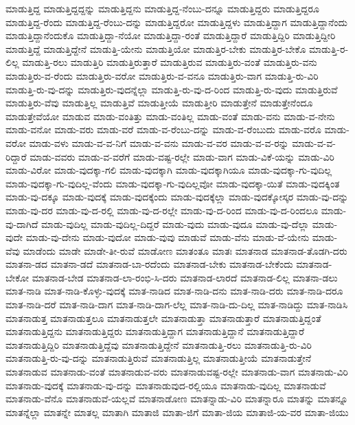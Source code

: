 {ಮಾಡುತ್ತಿದ್ದ
ಮಾಡುತ್ತಿದ್ದದ್ದನ್ನು
ಮಾಡುತ್ತಿದ್ದನು
ಮಾಡುತ್ತಿದ್ದ-ನೆಂಬು-ದನ್ನೂ
ಮಾಡುತ್ತಿದ್ದರು
ಮಾಡುತ್ತಿದ್ದರೂ
ಮಾಡುತ್ತಿದ್ದ-ರೆಂದು
ಮಾಡುತ್ತಿದ್ದ-ರೆಂಬು-ದನ್ನು
ಮಾಡುತ್ತಿದ್ದರೋ
ಮಾಡುತ್ತಿದ್ದಳು
ಮಾಡುತ್ತಿದ್ದಾಗ
ಮಾಡುತ್ತಿದ್ದಾನೆಂದು
ಮಾಡುತ್ತಿದ್ದಾನೆಂದುಕೊ
ಮಾಡುತ್ತಿದ್ದಾ-ನೆಯೋ
ಮಾಡುತ್ತಿದ್ದಾ-ರಂತೆ
ಮಾಡುತ್ತಿದ್ದಾರೆ
ಮಾಡುತ್ತಿದ್ದಿರಿ
ಮಾಡುತ್ತಿದ್ದೀರಿ
ಮಾಡುತ್ತಿದ್ದೆ
ಮಾಡುತ್ತಿದ್ದೇನೆ
ಮಾಡುತ್ತಿ-ಯೇನು
ಮಾಡುತ್ತಿಯೋ
ಮಾಡುತ್ತಿರ-ಬೇಕು
ಮಾಡುತ್ತಿರ-ಬೇಕೊ
ಮಾಡುತ್ತಿ-ರ-ಲಿಲ್ಲ
ಮಾಡುತ್ತಿ-ರಲು
ಮಾಡುತ್ತಿರಿ
ಮಾಡುತ್ತಿರುತ್ತಾರೆ
ಮಾಡುತ್ತಿರುವ
ಮಾಡುತ್ತಿರು-ವಂತೆ
ಮಾಡುತ್ತಿರು-ವನು
ಮಾಡುತ್ತಿರು-ವ-ರೆಂದು
ಮಾಡುತ್ತಿರು-ವರೋ
ಮಾಡುತ್ತಿರು-ವ-ವನೂ
ಮಾಡುತ್ತಿರು-ವಾಗ
ಮಾಡುತ್ತಿ-ರು-ವಿರಿ
ಮಾಡುತ್ತಿ-ರು-ವು-ದನ್ನು
ಮಾಡುತ್ತಿರು-ವುದನ್ನೆಲ್ಲಾ
ಮಾಡುತ್ತಿ-ರು-ವು-ದ-ರಿಂದ
ಮಾಡುತ್ತಿ-ರು-ವುದು
ಮಾಡುತ್ತಿರುವೆ
ಮಾಡುತ್ತಿರು-ವೆವು
ಮಾಡುತ್ತಿಲ್ಲ
ಮಾಡುತ್ತಿವೆ
ಮಾಡುತ್ತೀಯೆ
ಮಾಡುತ್ತೀರಿ
ಮಾಡುತ್ತೇನೆ
ಮಾಡುತ್ತೇನೆಂದೂ
ಮಾಡುತ್ತೇವೆಯೋ
ಮಾಡುವ
ಮಾಡು-ವಂತಿತ್ತು
ಮಾಡು-ವಂತಿಲ್ಲ
ಮಾಡು-ವಂತೆ
ಮಾಡು-ವನು
ಮಾಡು-ವ-ನೇನು
ಮಾಡು-ವನೋ
ಮಾಡು-ವರು
ಮಾಡು-ವರೆ
ಮಾಡು-ವ-ರೆಂಬು-ದನ್ನು
ಮಾಡು-ವ-ರೆಂಬುದು
ಮಾಡು-ವರೊ
ಮಾಡು-ವರೋ
ಮಾಡು-ವಳು
ಮಾಡು-ವ-ವ-ನಿಗೆ
ಮಾಡು-ವ-ವನು
ಮಾಡು-ವ-ವರ
ಮಾಡು-ವ-ವ-ರನ್ನು
ಮಾಡು-ವ-ವ-ರಿದ್ದಾರೆ
ಮಾಡು-ವವರು
ಮಾಡು-ವ-ವರೆಗೆ
ಮಾಡು-ವಷ್ಟ-ರಲ್ಲೇ
ಮಾಡು-ವಾಗ
ಮಾಡು-ವಿಕೆ-ಯನ್ನು
ಮಾಡು-ವಿರಿ
ಮಾಡು-ವಿರೋ
ಮಾಡು-ವುದಕ್ಕಾ-ಗಲಿ
ಮಾಡು-ವುದಕ್ಕಾಗಿ
ಮಾಡು-ವುದಕ್ಕಾಗಿಯೂ
ಮಾಡು-ವುದಕ್ಕಾ-ಗು-ವುದಿಲ್ಲ
ಮಾಡು-ವುದಕ್ಕಾ-ಗು-ವುದಿಲ್ಲ-ವೆಂದು
ಮಾಡು-ವುದಕ್ಕಾ-ಗು-ವುದಿಲ್ಲವೋ
ಮಾಡು-ವುದಕ್ಕಾ-ಯಿತೆ
ಮಾಡು-ವುದಕ್ಕಿಂತ
ಮಾಡು-ವು-ದಕ್ಕೂ
ಮಾಡು-ವುದಕ್ಕೆ
ಮಾಡು-ವುದಕ್ಕೆಂದು
ಮಾಡು-ವುದಕ್ಕೆಲ್ಲಾ
ಮಾಡು-ವುದಕ್ಕೋಸ್ಕರ
ಮಾಡು-ವು-ದನ್ನು
ಮಾಡು-ವು-ದರ
ಮಾಡು-ವು-ದ-ರಲ್ಲಿ
ಮಾಡು-ವು-ದ-ರಲ್ಲೇ
ಮಾಡು-ವು-ದ-ರಿಂದ
ಮಾಡು-ವು-ದ-ರಿಂದಲೂ
ಮಾಡು-ವು-ದಾಗಿದೆ
ಮಾಡು-ವುದಿಲ್ಲ
ಮಾಡು-ವುದಿಲ್ಲ-ದಿದ್ದರೆ
ಮಾಡು-ವುದು
ಮಾಡು-ವುದೂ
ಮಾಡು-ವು-ದೆಲ್ಲಾ
ಮಾಡು-ವುದೇ
ಮಾಡು-ವು-ದೇನು
ಮಾಡು-ವುದೋ
ಮಾಡು-ವುವು
ಮಾಡುವೆ
ಮಾಡು-ವೆನು
ಮಾಡು-ವೆ-ಯೇನು
ಮಾಡು-ವೆವು
ಮಾಡೆಂದು
ಮಾಡೇ
ಮಾಡೇ-ತೀ-ರುವೆ
ಮಾಡೋಣ
ಮಾತಂತೂ
ಮಾತಃ
ಮಾತನಾಡ
ಮಾತನಾಡ-ತೊಡಗಿ-ದರು
ಮಾತನಾ-ಡದ
ಮಾತನಾ-ಡದೆ
ಮಾತನಾಡ-ಬಾ-ರದೆಂದು
ಮಾತನಾಡ-ಬೇಕು
ಮಾತನಾಡ-ಬೇಕೆಂದು
ಮಾತನಾಡ-ಬೇಕೋ
ಮಾತನಾಡ-ಬೇಡ
ಮಾತನಾಡ-ಲಾ-ರಂಭಿ-ಸಿ-ದರು
ಮಾತನಾಡ-ಲಾರದೆ
ಮಾತನಾಡ-ಲಿಲ್ಲ
ಮಾತನಾ-ಡಲು
ಮಾತ-ನಾಡಿ
ಮಾತ-ನಾಡಿ-ಕೊಳ್ಳು-ವುದಕ್ಕೆ
ಮಾತ-ನಾಡಿದ
ಮಾತ-ನಾಡಿ-ದನು
ಮಾತ-ನಾಡಿ-ದರು
ಮಾತ-ನಾಡಿ-ದರೂ
ಮಾತ-ನಾಡಿ-ದರೆ
ಮಾತ-ನಾಡಿ-ದಾಗ
ಮಾತ-ನಾಡಿ-ದಾಗ-ಲೆಲ್ಲ
ಮಾತ-ನಾಡಿ-ದು-ದಿಲ್ಲ
ಮಾತ-ನಾಡಿದ್ದು
ಮಾತ-ನಾಡಿಸಿ
ಮಾತನಾಡುತ್ತ
ಮಾತನಾಡುತ್ತಲೂ
ಮಾತನಾಡುತ್ತಲೇ
ಮಾತನಾಡುತ್ತಾ
ಮಾತನಾಡುತ್ತಾರೆ
ಮಾತನಾಡುತ್ತಿದ್ದಂತೆ
ಮಾತನಾಡುತ್ತಿದ್ದನು
ಮಾತನಾಡುತ್ತಿದ್ದರು
ಮಾತನಾಡುತ್ತಿದ್ದಾಗ
ಮಾತನಾಡುತ್ತಿದ್ದಾನೆ
ಮಾತನಾಡುತ್ತಿದ್ದಾರೆ
ಮಾತನಾಡುತ್ತಿದ್ದಿರಿ
ಮಾತನಾಡುತ್ತಿದ್ದೆವು
ಮಾತನಾಡುತ್ತಿದ್ದೇನೆ
ಮಾತನಾಡುತ್ತಿ-ರಲು
ಮಾತನಾಡುತ್ತಿ-ರು-ವಿರಿ
ಮಾತನಾಡುತ್ತಿ-ರು-ವು-ದನ್ನು
ಮಾತನಾಡುತ್ತಿರುವೆ
ಮಾತನಾಡುತ್ತಿಲ್ಲ
ಮಾತನಾಡುತ್ತೀಯೆ
ಮಾತನಾಡುತ್ತೇನೆ
ಮಾತನಾಡುವ
ಮಾತನಾಡು-ವಂತೆ
ಮಾತನಾಡುವ-ವರು
ಮಾತನಾಡುವಷ್ಟ-ರಲ್ಲೇ
ಮಾತನಾಡು-ವಾಗ
ಮಾತನಾಡು-ವಿರಿ
ಮಾತನಾಡು-ವುದಕ್ಕೆ
ಮಾತನಾಡು-ವು-ದನ್ನು
ಮಾತನಾಡುವುದ-ರಲ್ಲಿಯೂ
ಮಾತನಾಡು-ವುದಿಲ್ಲ
ಮಾತನಾಡುವೆ
ಮಾತನಾಡು-ವೆನೊ
ಮಾತನಾಡುವೆ-ಯಲ್ಲವೆ
ಮಾತನಾಡೋಣ
ಮಾತನ್ನಾಡು-ವಿರಿ
ಮಾತನ್ನಾರೂ
ಮಾತನ್ನು
ಮಾತನ್ನೂ
ಮಾತನ್ನೆಲ್ಲಾ
ಮಾತನ್ನೇ
ಮಾತಲ್ಲ
ಮಾತಾಗಿ
ಮಾತಾಜಿ
ಮಾತಾ-ಜಿಗೆ
ಮಾತಾ-ಜಿಯ
ಮಾತಾಜಿ-ಯ-ವರ
ಮಾತಾ-ಜಿಯು
}
